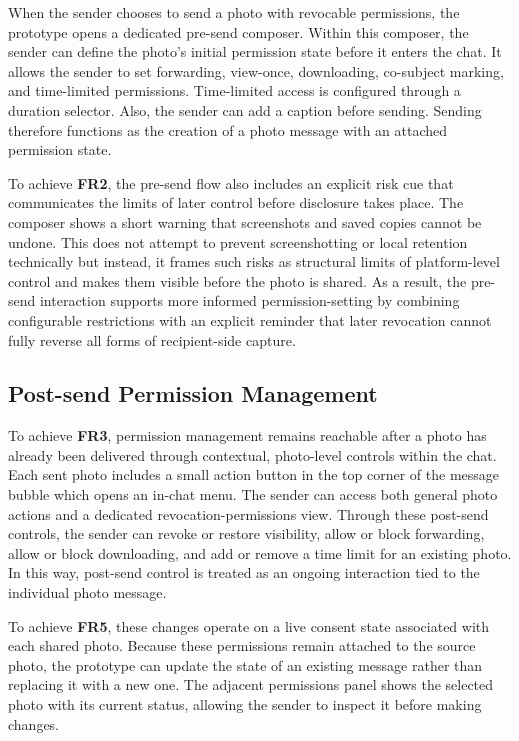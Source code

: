 When the sender chooses to send a photo with revocable permissions, the prototype opens a dedicated pre-send composer. Within this composer, the sender can define the photo’s initial permission state before it enters the chat. It allows the sender to set forwarding, view-once, downloading, co-subject marking, and time-limited permissions. Time-limited access is configured through a duration selector. Also, the sender can add a caption before sending. Sending therefore functions as the creation of a photo message with an attached permission state.

To achieve \textbf{FR2}, the pre-send flow also includes an explicit risk cue that communicates the limits of later control before disclosure takes place. The composer shows a short warning that screenshots and saved copies cannot be undone. This does not attempt to prevent screenshotting or local retention technically but instead, it frames such risks as structural limits of platform-level control and makes them visible before the photo is shared. As a result, the pre-send interaction supports more informed permission-setting by combining configurable restrictions with an explicit reminder that later revocation cannot fully reverse all forms of recipient-side capture.


\subsection{Post-send Permission Management}
To achieve \textbf{FR3}, permission management remains reachable after a photo has already been delivered through contextual, photo-level controls within the chat. Each sent photo includes a small action button in the top corner of the message bubble which opens an in-chat menu. The sender can access both general photo actions and a dedicated revocation-permissions view. Through these post-send controls, the sender can revoke or restore visibility, allow or block forwarding, allow or block downloading, and add or remove a time limit for an existing photo. In this way, post-send control is treated as an ongoing interaction tied to the individual photo message.

To achieve \textbf{FR5}, these changes operate on a live consent state associated with each shared photo. Because these permissions remain attached to the source photo, the prototype can update the state of an existing message rather than replacing it with a new one. The adjacent permissions panel shows the selected photo with its current status, allowing the sender to inspect it before making changes.

